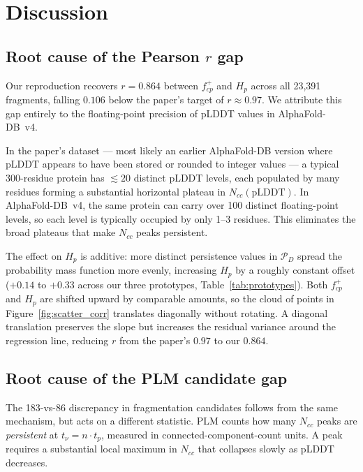 \section{Discussion}
\label{sec:discussion}

\subsection{Root cause of the Pearson $r$ gap}
\label{sec:disc_precision}

Our reproduction recovers $r = 0.864$ between $f^+_{cp}$ and $H_p$
across all 23{,}391 fragments, falling $0.106$ below the paper's target
of $r \approx 0.97$.
We attribute this gap entirely to the floating-point precision of pLDDT
values in AlphaFold-DB~v4.

In the paper's dataset --- most likely an earlier AlphaFold-DB version
where pLDDT appears to have been stored or rounded to integer values ---
a typical 300-residue protein has $\lesssim\!20$ distinct pLDDT levels,
each populated by many residues forming a substantial horizontal plateau
in $N_{cc}(\mathrm{pLDDT})$.
In AlphaFold-DB~v4, the same protein can carry over 100 distinct
floating-point levels, so each level is typically occupied by only 1--3
residues.
This eliminates the broad plateaus that make $N_{cc}$ peaks persistent.

The effect on $H_p$ is additive: more distinct persistence values in
$\mathcal{P}_D$ spread the probability mass function more evenly,
increasing $H_p$ by a roughly constant offset ($+0.14$ to $+0.33$ across
our three prototypes, Table~\ref{tab:prototypes}).
Both $f^+_{cp}$ and $H_p$ are shifted upward by comparable amounts, so
the cloud of points in Figure~\ref{fig:scatter_corr} translates
diagonally without rotating.
A diagonal translation preserves the slope but increases the residual
variance around the regression line, reducing $r$ from the paper's $0.97$
to our $0.864$.

\subsection{Root cause of the PLM candidate gap}
\label{sec:disc_plm}

The 183-vs-86 discrepancy in fragmentation candidates follows from the
same mechanism, but acts on a different statistic.
PLM counts how many $N_{cc}$ peaks are \emph{persistent} at
$t_\nu = n \cdot t_p$, measured in connected-component-count units.
A peak requires a substantial local maximum in $N_{cc}$ that collapses
slowly as pLDDT decreases.

